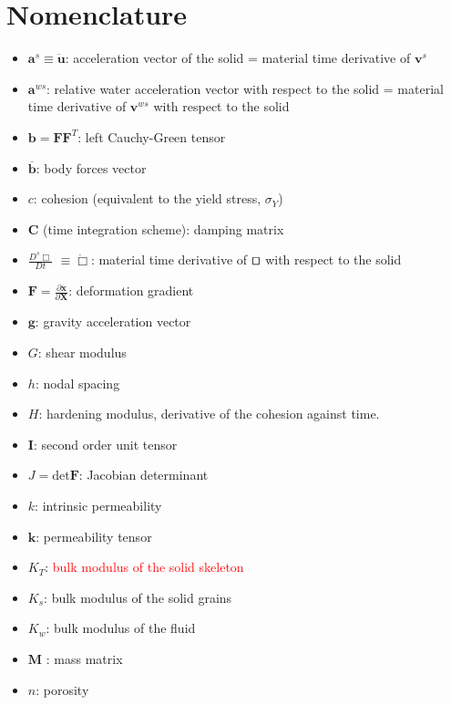 \documentclass[twocolumn]{svjour3}          %
\begin{document}


\section*{Nomenclature}
\label{nom}

\begin{itemize}
\item $\boldsymbol{a}^s \equiv \boldsymbol{\ddot{u}}$: acceleration vector of the solid = material time derivative of $\boldsymbol{v}^s$
\item $\boldsymbol{a}^{ws}$: relative water acceleration vector with respect to the solid = material time derivative of $\boldsymbol{v}^{ws}$ with respect to the solid 
\item $\boldsymbol{b}=\boldsymbol{F}\boldsymbol{F}^{T}$: left Cauchy-Green tensor
\item $\boldsymbol{\overline{b}}$: body forces vector
\item $c$: cohesion (equivalent to the yield stress, $\sigma_Y$)
\item $\boldsymbol{C}$ (time integration scheme): damping matrix
\item $\frac{D^s\Box}{Dt}$ $\equiv \dot\Box$: material time derivative of $\qed$ with respect to the solid
\item $\boldsymbol{F}=\frac{\partial\boldsymbol{x}}{\partial\boldsymbol{X}}$: deformation gradient
\item $\boldsymbol{g}$: gravity acceleration vector
\item $G$: shear modulus
\item $h$: nodal spacing
\item $H$: hardening modulus, derivative of the cohesion against time.
\item $\boldsymbol{I}$: second order unit tensor
\item $J=\mbox{det}\boldsymbol{F}$: Jacobian determinant
\item $k$: intrinsic permeability
\item $\boldsymbol{k}$: permeability tensor
\item $K_T$: \textcolor{red}{bulk modulus of the solid skeleton}
\item $K_s$: bulk modulus of the solid grains
\item $K_w$: bulk modulus of the fluid
\item $\boldsymbol{M}$ : mass matrix
\item $n$: porosity

\end{itemize}
\end{document}

